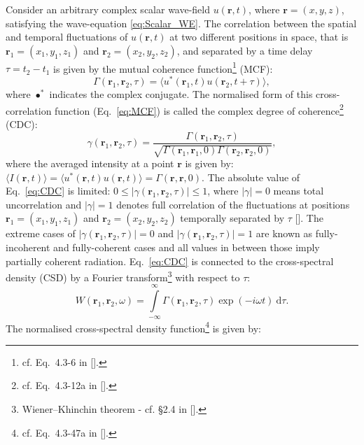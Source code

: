 \begin{refsection}
Consider an arbitrary complex scalar wave-field $u(\textbf{r},t)$, where $\textbf{r}=(x,y,z)$, satisfying the wave-equation \ref{eq:Scalar_WE}. The correlation between the spatial and temporal fluctuations of $u(\textbf{r},t)$ at two different positions in space, that is $\textbf{r}_1 = (x_1,y_1,z_1)$ and $\textbf{r}_2 = (x_2,y_2,z_2)$, and separated by a time delay $\tau=t_2-t_1$ is given by the mutual coherence function\footnote{cf. Eq.~4.3-6 in [\cite{Mandel1995}].} (MCF):
\begin{equation}\label{eq:MCF}
    \Gamma(\textbf{r}_1,\textbf{r}_2,\tau) = \big\langle u^*(\textbf{r}_1,t)u(\textbf{r}_2,t+\tau)\big\rangle,
\end{equation}
where $\bullet^*$ indicates the complex conjugate. The normalised form of this cross-correlation function (Eq.~\ref{eq:MCF}) is called the complex degree of coherence\footnote{cf. Eq.~4.3-12a in [\cite{Mandel1995}].} (CDC):
\begin{equation}\label{eq:CDC}
    \gamma(\textbf{r}_1,\textbf{r}_2,\tau) = \frac{\Gamma(\textbf{r}_1,\textbf{r}_2,\tau)}{\sqrt{\Gamma(\textbf{r}_1,\textbf{r}_1,0)\Gamma(\textbf{r}_2,\textbf{r}_2,0)}},
\end{equation}
where the averaged intensity at a point $\textbf{r}$ is given by: $\big\langle I(\textbf{r},t)\big\rangle = \big\langle u^*(\textbf{r},t)u(\textbf{r},t)\big\rangle = \Gamma(\textbf{r},\textbf{r},0)$. The absolute value of Eq.~\ref{eq:CDC} is limited: $0\leq|\gamma(\textbf{r}_1,\textbf{r}_2,\tau)|\leq 1$, where $|\gamma|=0$ means total uncorrelation and $|\gamma|=1$ denotes full correlation of the fluctuations at positions  $\textbf{r}_1 = (x_1,y_1,z_1)$ and $\textbf{r}_2 = (x_2,y_2,z_2)$ temporally separated by $\tau$ [\cite[\textit{§11}]{Saleh2019}]. The extreme cases of $|\gamma(\textbf{r}_1,\textbf{r}_2,\tau)|=0$ and $|\gamma(\textbf{r}_1,\textbf{r}_2,\tau)|=1$ are known as fully-incoherent and fully-coherent cases and all values in between those imply partially coherent radiation. Eq.~\ref{eq:CDC} is connected to the cross-spectral density (CSD) by a Fourier transform\footnote{Wiener–Khinchin theorem - cf. §2.4 in [\cite{Mandel1995}].} with respect to $\tau$:
\begin{equation}\label{eq:CSD}
    W(\textbf{r}_1,\textbf{r}_2,\omega)=\int\limits_{-\infty}^\infty{\Gamma(\textbf{r}_1,\textbf{r}_2, \tau)\exp{(-i\omega t)}~\mathrm{d}\tau}.
\end{equation}{}
The normalised cross-spectral density function\footnote{cf. Eq.~4.3-47a in [\cite{Mandel1995}].} is given by:
\begin{equation}\label{eq:SDC}

\end{equation}
\end{refsection}
